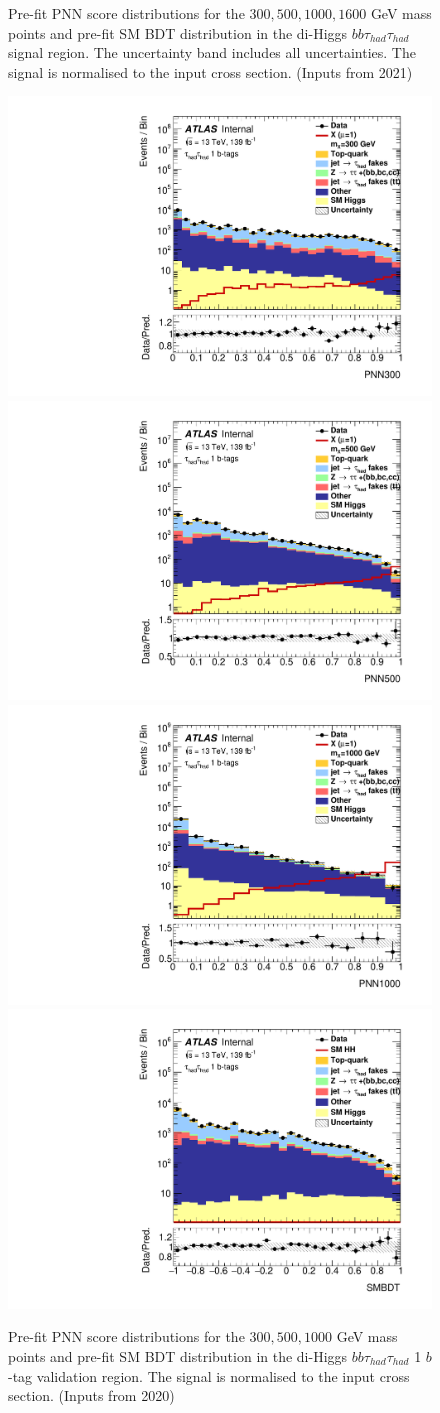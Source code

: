 \begin{figure}
\caption{Pre-fit PNN score distributions for the $300, 500, 1000, 1600$ GeV mass points and pre-fit SM BDT distribution in the di-Higgs $bb\tau_{had}\tau_{had}$ signal region. The uncertainty band includes all uncertainties. The signal is normalised to the input cross section. (Inputs from 2021)}
\label{fig:HadHadPreselectionPNNScoreDistributions}
\end{figure}

\begin{figure}
\centering
\includegraphics[width=.45\textwidth]{figures/mva/HH/HadHad/Region_BMin0_incJet1_distPNN300_J2_Y2015_DLLOS_T1_SpcTauHH_L0_Prefitlog.pdf}
\includegraphics[width=.45\textwidth]{figures/mva/HH/HadHad/Region_BMin0_incJet1_distPNN500_J2_Y2015_DLLOS_T1_SpcTauHH_L0_Prefitlog.pdf}\\
\includegraphics[width=.45\textwidth]{figures/mva/HH/HadHad/Region_BMin0_incJet1_distPNN1000_J2_Y2015_DLLOS_T1_SpcTauHH_L0_Prefitlog.pdf}
\includegraphics[width=.45\textwidth]{figures/mva/HH/HadHad/Region_BMin0_incJet1_distSMBDT_J2_Y2015_DLLOS_T1_SpcTauHH_L0_Prefitlog.pdf}
\caption{Pre-fit PNN score distributions for the $300, 500, 1000$ GeV mass points and pre-fit SM BDT distribution in the di-Higgs $bb\tau_{had}\tau_{had}$ 1 $b$-tag validation region. The signal is normalised to the input cross section. (Inputs from 2020)}
\label{fig:HadHadPreselectionPNNScoreDistributions1bTag}
\end{figure}

